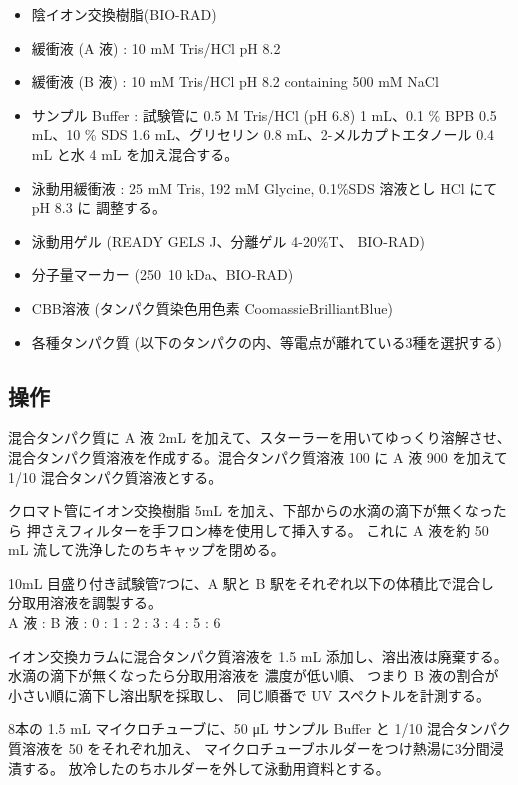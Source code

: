 \documentclass[a4paper]{ltjsarticle}
\begin{document}
\begin{itemize}
    \item 陰イオン交換樹脂(BIO-RAD)
    \item 緩衝液 (A 液) : 10 mM Tris/HCl pH 8.2
    \item 緩衝液 (B 液) : 10 mM Tris/HCl pH 8.2 containing 500 mM NaCl
    \item サンプル Buffer : 試験管に 0.5 M Tris/HCl (pH 6.8) 1 mL、0.1 \% BPB 0.5 mL、10 \%
        SDS 1.6 mL、グリセリン 0.8 mL、2-メルカプトエタノール 0.4 mL と水 4 mL を加え混合する。
    \item 泳動用緩衝液 : 25 mM Tris, 192 mM Glycine, 0.1\%SDS 溶液とし HCl にて pH 8.3 に 調整する。
    \item 泳動用ゲル (READY GELS J、分離ゲル 4-20\%T、 BIO-RAD)
    \item 分子量マーカー (250~10 kDa、BIO-RAD)
    \item CBB溶液 (タンパク質染色用色素 CoomassieBrilliantBlue)
    \item 各種タンパク質 (以下のタンパクの内、等電点が離れている3種を選択する)
\end{itemize}


\subsection{操作}

混合タンパク質に A 液 2mL を加えて、スターラーを用いてゆっくり溶解させ、
混合タンパク質溶液を作成する。混合タンパク質溶液 100 \uL に A 液 900 \uL を加えて
1/10 混合タンパク質溶液とする。

クロマト管にイオン交換樹脂 5mL を加え、下部からの水滴の滴下が無くなったら
押さえフィルターを手フロン棒を使用して挿入する。
これに A 液を約 50 mL 流して洗浄したのちキャップを閉める。

10mL 目盛り付き試験管7つに、A 駅と B 駅をそれぞれ以下の体積比で混合し
分取用溶液を調製する。\\
A 液 : B 液  : 0  : 1  : 2  : 3  : 4  : 5  : 6

イオン交換カラムに混合タンパク質溶液を 1.5 mL 添加し、溶出液は廃棄する。
水滴の滴下が無くなったら分取用溶液を  濃度が低い順、
つまり B 液の割合が小さい順に滴下し溶出駅を採取し、
同じ順番で UV スペクトルを計測する。

8本の 1.5 mL マイクロチューブに、50 \si{\micro L} サンプル Buffer と
1/10 混合タンパク質溶液を 50 \uL をそれぞれ加え、
マイクロチューブホルダーをつけ熱湯に3分間浸漬する。
放冷したのちホルダーを外して泳動用資料とする。
\end{document}
